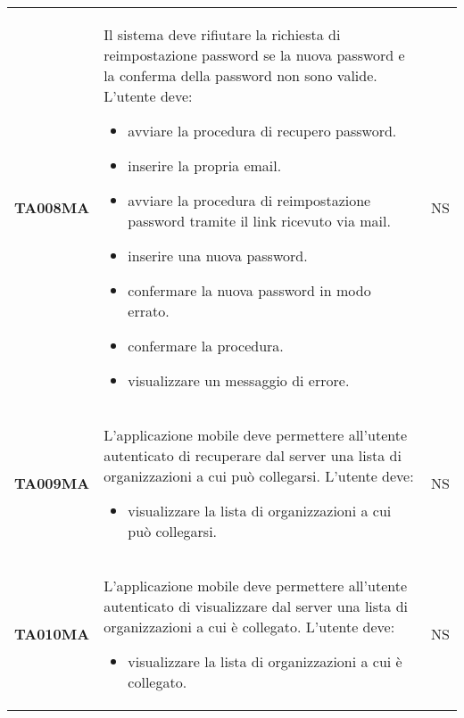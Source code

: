\documentclass[../piano-di-qualifica.tex]{subfiles}
\begin{document}
\begin{longtable}[H]{>{\centering\bfseries}m{3cm} >{}m{10cm} >{\centering\arraybackslash}m{3cm}}
  TA008MA           & Il sistema deve rifiutare la richiesta di reimpostazione password se la nuova password e la conferma della password non sono valide. \newline
  L'utente deve:
  \begin{itemize}
    \item avviare la procedura di recupero password.
    \item inserire la propria email.
    \item avviare la procedura di reimpostazione password tramite il link ricevuto via mail.
    \item inserire una nuova password.
    \item confermare la nuova password in modo errato.
    \item confermare la procedura.
    \item visualizzare un messaggio di errore.
  \end{itemize}
                    & NS                                                                                                                                                                                                                                                               \\
  TA009MA           & L'applicazione mobile deve permettere all'utente autenticato di recuperare dal server una lista di organizzazioni a cui può collegarsi. \newline
  L'utente deve:
  \begin{itemize}
    \item visualizzare la lista di organizzazioni a cui può collegarsi.
  \end{itemize}
                    & NS                                                                                                                                                                                                                                                               \\
  TA010MA           & L'applicazione mobile deve permettere all'utente autenticato di visualizzare dal server una lista di organizzazioni a cui è collegato. \newline
  L'utente deve:
  \begin{itemize}
    \item visualizzare la lista di organizzazioni a cui è collegato.
  \end{itemize}
                    & NS                                                                                                                                                                                                                                                               \\

\end{longtable}
\end{document}
